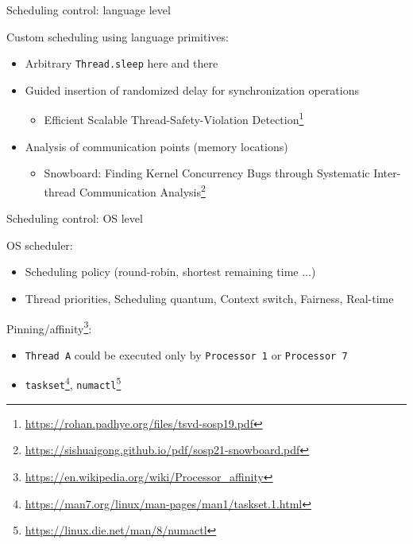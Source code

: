 
\begin{frame}[t]{Scheduling control: language level}

Custom scheduling using language primitives:
\begin{itemize}
  \item Arbitrary \texttt{Thread.sleep} here and there
  \pause \item Guided insertion of randomized delay for synchronization operations
  \begin{itemize}
    \item Efficient Scalable Thread-Safety-Violation Detection\footnote<2->{\tiny\url{https://rohan.padhye.org/files/tsvd-sosp19.pdf}}
  \end{itemize}

  \pause \item Analysis of communication points (memory locations)
  \begin{itemize}
    \item Snowboard: Finding Kernel Concurrency Bugs through Systematic Inter-thread Communication Analysis\footnote<3->{\tiny\url{https://sishuaigong.github.io/pdf/sosp21-snowboard.pdf}}
  \end{itemize}
\end{itemize}

\pause

\alarmThree

\end{frame}


\begin{frame}[t]{Scheduling control: OS level}

OS scheduler:
\begin{itemize}
  \item Scheduling policy (round-robin, shortest remaining time ...)
  \item Thread priorities, Scheduling quantum, Context switch, Fairness, Real-time
\end{itemize}

\pause

Pinning/affinity\footnote<2->{\tiny\url{https://en.wikipedia.org/wiki/Processor_affinity}}:
\begin{itemize}
  \item \texttt{Thread A} could be executed only by \texttt{Processor 1} or \texttt{Processor 7}
  \item \texttt{taskset}\footnote<2->{\tiny\url{https://man7.org/linux/man-pages/man1/taskset.1.html}}, \texttt{numactl}\footnote<2->{\tiny\url{https://linux.die.net/man/8/numactl}}
\end{itemize}

\end{frame}

